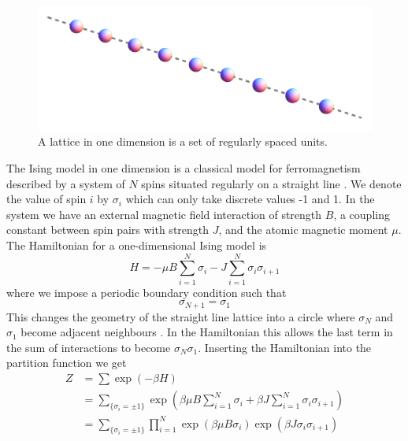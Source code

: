 \begin{figure}[bp]
\centering \includegraphics[scale=0.2]{Graphics/TransferMatrix/lattice_1d.png}
\caption{A lattice in one dimension is a set of regularly spaced units.}
\label{fig:1dlattice} 
\end{figure}

The Ising model in one dimension is a classical model for ferromagnetism described by a system of $N$ spins situated regularly on a straight line .  We denote the value of spin $i$ by $\sigma_i$ which can only take discrete values -1 and 1. In the system we have an external magnetic field interaction of strength $B$, a coupling constant between spin pairs with strength $J$, and the atomic magnetic moment $\mu$. The Hamiltonian for a one-dimensional Ising model is \cite{Newell1953,Yeomans1992}
%
\begin{equation}\label{1disinghamiltonian}
H=-\mu B\sum^{N}_{i=1}\sigma_{i}-J\sum^{N}_{i=1}\sigma_{i}\sigma_{i+1}
\end{equation}
%
where we impose a periodic boundary condition such that 
%
\begin{equation}\label{1disingboundarycondition}
\sigma_{N+1}=\sigma_{1}
\end{equation}
%
This changes the geometry of the straight line lattice into a circle where $\sigma_{N}$ and $\sigma_{1}$ become adjacent neighbours . In the Hamiltonian this allows the last term in the sum of interactions to become $\sigma_{N}\sigma_{1}$. Inserting the Hamiltonian into the partition function we get 
%
%
\begin{align}
Z &=\sum\exp\left( -\beta H\right)\\
&=\sum_{\{\sigma_{i}=\pm1\}}\exp\left(\beta\mu B\sum^{N}_{i=1}\sigma_{i}+\beta J\sum^{N}_{i=1}\sigma_{i}\sigma_{i+1}\right)\\
&=\sum_{\{\sigma_{i}=\pm1\}}\prod^{N}_{i=1}\exp\left( \beta \mu B\sigma_{i}\right)\exp\left(\beta J\sigma_{i}\sigma_{i+1}\right) \label{1dising1}
\end{align}
